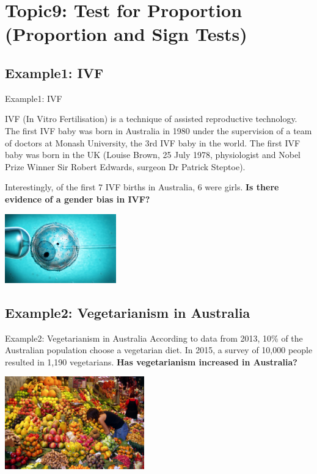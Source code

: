 \documentclass[t,xcolor=pdftex,dvipsnames,table]{beamer}\usepackage[]{graphicx}\usepackage[]{color}
\begin{document}
\section[9]{Topic9: Test for Proportion (Proportion and Sign Tests)}

\subsection[Example]{Example1: IVF}
\begin{frame}{Example1: IVF}

IVF (In Vitro Fertilisation) is a technique of assisted reproductive technology.
The first IVF baby was born in Australia in 1980 under the supervision of a team of doctors at Monash University, the 3rd IVF baby in the world. The first IVF baby was born in the UK (Louise Brown, 25 July 1978, physiologist and Nobel Prize Winner Sir Robert Edwards, surgeon Dr Patrick Steptoe).

\vspace{.5cm}
Interestingly, of the first 7 IVF births in Australia, 6 were girls. {\bf Is there evidence of a gender bias in IVF?}

\begin{center}
\includegraphics[height=3cm]{../images/IVF.jpg}
\end{center}
\end{frame}

\subsection[Example]{Example2: Vegetarianism in Australia}
\begin{frame}{Example2: Vegetarianism in Australia}
According to data from 2013, 10\% of the Australian population choose a vegetarian diet. In 2015, a survey of 10,000 people resulted in 1,190 vegetarians.
{\bf Has vegetarianism increased in Australia?}

\begin{center}
\includegraphics[height=4cm]{../images/BarcelonaFruit.jpg}
\end{center}
\href{http://www.roymorgan.com/findings/5264-meat-free-health-conscious-anxious-australias-vegetarians-201310272327}{}
\end{frame}
\end{document}
